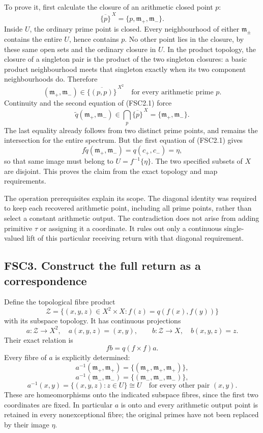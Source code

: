 To prove it, first calculate the closure of an arithmetic closed point
\(p\): \[
\overline{\{p\}}^{\,X}=\{p,\mathfrak m_+,\mathfrak m_-\}.
\tag{FSC2.2}
\] Inside \(U\), the ordinary prime point is closed. Every neighbourhood
of either \(\mathfrak m_\pm\) contains the entire \(U\), hence contains
\(p\). No other point lies in the closure, by these same open sets and
the ordinary closure in \(U\). In the product topology, the closure of a
singleton pair is the product of the two singleton closures: a basic
product neighbourhood meets that singleton exactly when its two
component neighbourhoods do. Therefore \[
(\mathfrak m_+,\mathfrak m_-)\in\overline{\{(p,p)\}}^{\,X^2}
\quad\text{for every arithmetic prime }p.
\] Continuity and the second equation of (FSC2.1) force \[
\widetilde q(\mathfrak m_+,\mathfrak m_-)
\in\bigcap_p\overline{\{p\}}^{\,X}
=\{\mathfrak m_+,\mathfrak m_-\}.
\tag{FSC2.3}
\] The last equality already follows from two distinct prime points, and
remains the intersection for the entire spectrum. But the first equation
of (FSC2.1) gives \[
f\widetilde q(\mathfrak m_+,\mathfrak m_-)=q(c_+,c_-)=\eta,
\] so that same image must belong to \(U=f^{-1}\{\eta\}\). The two
specified subsets of \(X\) are disjoint. This proves the claim from the
exact topology and map requirements.

The operation prerequisites explain its scope. The diagonal identity was
required to keep each recovered arithmetic point, including all prime
points, rather than select a constant arithmetic output. The
contradiction does not arise from adding primitive \(\tau\) or assigning
it a coordinate. It rules out only a continuous single-valued lift of
this particular receiving return with that diagonal requirement.

\subsection{FSC3. Construct the full return as a
correspondence}\label{fsc3.-construct-the-full-return-as-a-correspondence}

Define the topological fibre product \[
\mathcal Z=\{(x,y,z)\in X^2\times X:f(z)=q(f(x),f(y))\}
\tag{FSC3.1}
\] with its subspace topology. It has continuous projections \[
a:\mathcal Z\to X^2,\quad a(x,y,z)=(x,y),\qquad
b:\mathcal Z\to X,\quad b(x,y,z)=z.
\tag{FSC3.2}
\] Their exact relation is \[
fb=q(f\times f)a.
\tag{FSC3.3}
\] Every fibre of \(a\) is explicitly determined: \[
a^{-1}(\mathfrak m_+,\mathfrak m_+)=\{(\mathfrak m_+,\mathfrak m_+,\mathfrak m_+)\},
\] \[
a^{-1}(\mathfrak m_-,\mathfrak m_-)=\{(\mathfrak m_-,\mathfrak m_-,\mathfrak m_-)\},
\] \[
a^{-1}(x,y)=\{(x,y,z):z\in U\}\cong U
\quad\text{for every other pair }(x,y).
\tag{FSC3.4}
\] These are homeomorphisms onto the indicated subspace fibres, since
the first two coordinates are fixed. In particular \(a\) is onto and
every arithmetic output point is retained in every nonexceptional fibre;
the original primes have not been replaced by their image \(\eta\).

